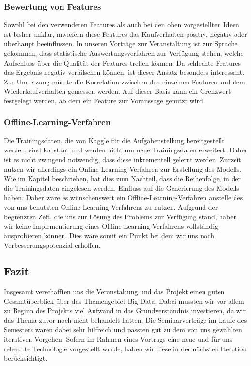 \subsubsection{Bewertung von Features}	
Sowohl bei den verwendeten Features als auch bei den oben vorgestellten Ideen ist bisher unklar, inwiefern diese Features das Kaufverhalten positiv, negativ oder überhaupt beeinflussen.
In unseren Vorträge zur Veranstaltung ist zur Sprache gekommen, dass statistische Auswertungsverfahren zur Verfügung stehen, welche Aufschluss über die Qualität der Features treffen können. Da schlechte Features das Ergebnis negativ verfälschen können, ist dieser Ansatz besonders interessant.
Zur Umsetzung müsste die Korrelation zwischen den einzelnen Features und dem Wiederkaufverhalten gemessen werden. Auf dieser Basis kann ein Grenzwert festgelegt werden, ab dem ein Feature
zur Voraussage genutzt wird.

\subsubsection{Offline-Learning-Verfahren}	
Die Trainingsdaten, die von Kaggle für die Aufgabenstellung bereitgestellt werden, sind konstant und werden 
nicht um neue Trainingsdaten erweitert. Daher ist es nicht zwingend notwendig, dass diese inkrementell gelernt
werden. Zurzeit nutzen wir allerdings ein Online-Learning-Verfahren zur Erstellung des Modells. Wie im Kapitel
 beschrieben, hat dies zum Nachteil, dass die Reihenfolge, in der die Trainingsdaten
eingelesen werden, Einfluss auf die Generierung des Modells haben. Daher wäre es wünschenswert ein Offline-Learning-Verfahren
anstelle des von uns benutzten Online-Learning-Verfahrens zu nutzen. Aufgrund der begrenzten Zeit, die uns zur 
Lösung des Problems zur Verfügung stand, haben wir keine Implementierung eines Offline-Learning-Verfahrens vollständig 
ausprobieren können. Dies wäre somit ein Punkt bei dem wir uns noch Verbesserungspotenzial erhoffen.

\subsection{Fazit}
Insgesamt verschafften uns die Veranstaltung und das Projekt einen guten Gesamtüberblick über das Themengebiet Big-Data.
Dabei mussten wir vor allem zu Beginn des Projekts viel Aufwand in das Grundverständnis investieren, da wir das Thema zuvor noch nicht behandelt hatten. Die Seminarvorträge im Laufe des Semesters waren dabei sehr hilfreich und passten gut zu dem von uns gewählten iterativen Vorgehen. Sofern im Rahmen eines Vortrags eine neue und für uns relevante Technologie vorgestellt wurde, haben wir diese in der nächsten Iteration berücksichtigt.  

